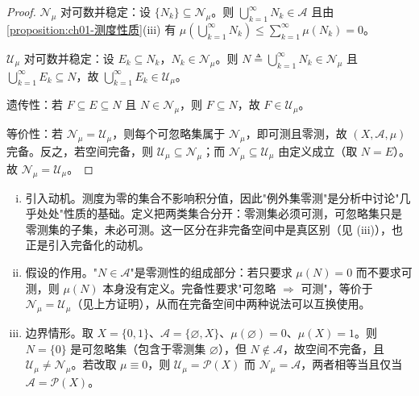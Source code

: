 \documentclass[../../main.tex]{subfiles}%
\begin{document}
\begin{proof}
$\mathcal{N}_\mu$ 对可数并稳定：设 $\{N_k\}\subseteq\mathcal{N}_\mu$。则 $\bigcup_{k=1}^\infty N_k\in\mathcal{A}$ 且由\cref{proposition:ch01-测度性质}(iii) 有 $\mu\left(\bigcup_{k=1}^\infty N_k\right)\leqslant\sum_{k=1}^\infty\mu(N_k)=0$。

$\mathcal{U}_\mu$ 对可数并稳定：设 $E_k\subseteq N_k$，$N_k\in\mathcal{N}_\mu$。则 $N\triangleq\bigcup_{k=1}^\infty N_k\in\mathcal{N}_\mu$ 且 $\bigcup_{k=1}^\infty E_k\subseteq N$，故 $\bigcup_{k=1}^\infty E_k\in\mathcal{U}_\mu$。

遗传性：若 $F\subseteq E\subseteq N$ 且 $N\in\mathcal{N}_\mu$，则 $F\subseteq N$，故 $F\in\mathcal{U}_\mu$。

等价性：若 $\mathcal{N}_\mu=\mathcal{U}_\mu$，则每个可忽略集属于 $\mathcal{N}_\mu$，即可测且零测，故 $(X,\mathcal{A},\mu)$ 完备。反之，若空间完备，则 $\mathcal{U}_\mu\subseteq\mathcal{N}_\mu$；而 $\mathcal{N}_\mu\subseteq\mathcal{U}_\mu$ 由定义成立（取 $N=E$）。故 $\mathcal{N}_\mu=\mathcal{U}_\mu$。
\end{proof}

\begin{remark}\label{remark:ch01-零测集注}
\begin{enumerate}[(i)]
\item 引入动机。测度为零的集合不影响积分值，因此"例外集零测"是分析中讨论"几乎处处"性质的基础。定义把两类集合分开：零测集必须可测，可忽略集只是零测集的子集，未必可测。这一区分在非完备空间中是真区别（见 (iii)），也正是引入完备化的动机。
\item 假设的作用。"$N\in\mathcal{A}$"是零测性的组成部分：若只要求 $\mu(N)=0$ 而不要求可测，则 $\mu(N)$ 本身没有定义。完备性要求"可忽略 $\Rightarrow$ 可测"，等价于 $\mathcal{N}_\mu=\mathcal{U}_\mu$（见上方证明），从而在完备空间中两种说法可以互换使用。
\item 边界情形。取 $X=\{0,1\}$、$\mathcal{A}=\{\varnothing ,X\}$、$\mu(\varnothing )=0$、$\mu(X)=1$。则 $N=\{0\}$ 是可忽略集（包含于零测集 $\varnothing$），但 $N\notin\mathcal{A}$，故空间不完备，且 $\mathcal{U}_\mu\neq\mathcal{N}_\mu$。若改取 $\mu\equiv0$，则 $\mathcal{U}_\mu=\mathcal{P}(X)$ 而 $\mathcal{N}_\mu=\mathcal{A}$，两者相等当且仅当 $\mathcal{A}=\mathcal{P}(X)$。
\end{enumerate}
\end{remark}
\end{document}
